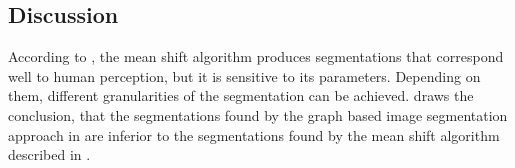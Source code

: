 \subsection{Discussion}\label{subsec:traditional-approaches-discussion}
According to \cite{pantofaru2005comparison}, the mean shift algorithm produces
segmentations that correspond well to human perception, but it is sensitive to
its parameters. Depending on them, different granularities of the segmentation
can be achieved. \cite{pantofaru2005comparison} draws the conclusion, that
the segmentations found by the graph based image segmentation approach
in \cite{felzenszwalb2004efficient} are inferior to the segmentations found
by the mean shift algorithm described in \cite{comaniciu2002mean}.
